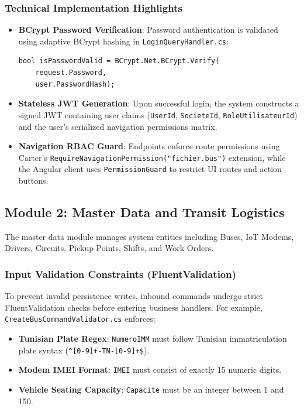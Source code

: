 \subsubsection{Technical Implementation Highlights}
\begin{itemize}
  \item \textbf{BCrypt Password Verification}: Password authentication is validated using adaptive BCrypt hashing in \texttt{LoginQueryHandler.cs}:
\begin{verbatim}
bool isPasswordValid = BCrypt.Net.BCrypt.Verify(
    request.Password, 
    user.PasswordHash);
\end{verbatim}
  \item \textbf{Stateless JWT Generation}: Upon successful login, the system constructs a signed JWT containing user claims (\texttt{UserId}, \texttt{SocieteId}, \texttt{RoleUtilisateurId}) and the user's serialized navigation permissions matrix.
  \item \textbf{Navigation RBAC Guard}: Endpoints enforce route permissions using Carter's \texttt{RequireNavigationPermission("fichier.bus")} extension, while the Angular client uses \texttt{PermissionGuard} to restrict UI routes and action buttons.
\end{itemize}

\subsection{Module 2: Master Data and Transit Logistics}
\label{sec:impl_master_data}

The master data module manages system entities including Buses, IoT Modems, Drivers, Circuits, Pickup Points, Shifts, and Work Orders.

\subsubsection{Input Validation Constraints (FluentValidation)}
To prevent invalid persistence writes, inbound commands undergo strict FluentValidation checks before entering business handlers. For example, \texttt{CreateBusCommandValidator.cs} enforces:
\begin{itemize}
  \item \textbf{Tunisian Plate Regex}: \texttt{NumeroIMM} must follow Tunisian immatriculation plate syntax (\verb|^[0-9]+-TN-[0-9]+$|).
  \item \textbf{Modem IMEI Format}: \texttt{IMEI} must consist of exactly 15 numeric digits.
  \item \textbf{Vehicle Seating Capacity}: \texttt{Capacite} must be an integer between 1 and 150.
\end{itemize}

